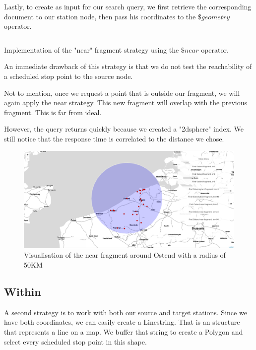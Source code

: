 Lastly, to create  as input for our search query, we first retrieve the corresponding document to our station node, then pass his coordinates to the $\$geometry$ operator.

\begin{listing}[H]
    \inputminted[linenos,frame=single,breaklines]{TypeScript}{code/near.ts}
    \caption{Implementation of the "near" fragment strategy using the $\$near$ operator.}
\end{listing}

An immediate drawback of this strategy is that we do not test the reachability of a scheduled stop point to the source node.

Not to mention, once we request a point that is outside our fragment, we will again apply the near strategy. This new fragment will overlap with the previous fragment. This is far from ideal.



However, the query returns quickly because we created a "2dsphere" index. We still notice that the response time is correlated to the distance we chose. 

\begin{figure}[H]
    \centering
    \includegraphics[width=\textwidth]{images/near visualized.png}
    \caption{Visualisation of the near fragment around Ostend with a radius of 50KM}
    \label{fig:near-visualized}
\end{figure}
\subsection{Within}
A second strategy is to work with both our source and target stations. Since we have both coordinates, we can easily create a Linestring. That is an  structure that represents a line on a map. We buffer that string to create a Polygon and select every scheduled stop point in this shape.

